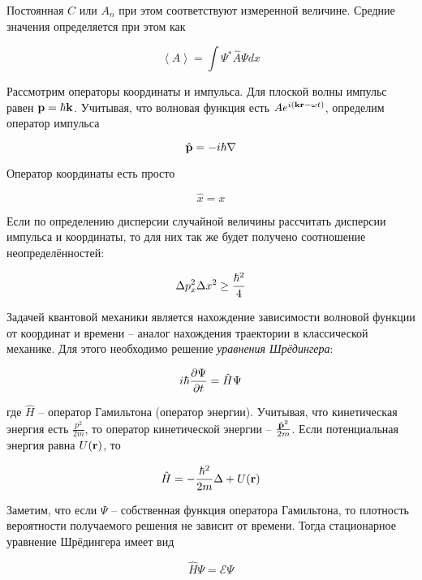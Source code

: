 \noindent
Постоянная $C$ или $A_n$ при этом соответствуют измеренной величине. Средние значения определяется при этом как

\begin{equation}
    \left< A \right> = \int \Psi^* \hat{A} \Psi dx
\end{equation}

Рассмотрим операторы координаты и импульса. Для плоской волны импульс равен $\mathbf p = \hbar \mathbf k$. Учитывая, что волновая функция есть $A e^{i \left( \mathbf k \mathbf r - \omega t \right)}$, определим оператор импульса

\begin{equation}
    \hat{\mathbf p} = - i \hbar \nabla
\end{equation}

\noindent
Оператор координаты есть просто

\begin{equation}
    \hat{x} = x
\end{equation}

Если по определению дисперсии случайной величины рассчитать дисперсии импульса и координаты, то для них так же будет получено соотношение неопределённостей:

\begin{equation}
    \Delta p_x^2 \Delta x^2 \geq \frac{\hbar^2}{4}
\end{equation}

Задачей квантовой механики является нахождение зависимости волновой функции от координат и времени -- аналог нахождения траектории в классической механике. Для этого необходимо решение \textit{уравнения Шрёдингера}:

\begin{equation}
    i \hbar \frac{\partial \Psi}{\partial t} = \hat{H} \Psi
\end{equation}

\noindent
где $\hat H$ -- оператор Гамильтона (оператор энергии). Учитывая, что кинетическая энергия есть $\frac{p^2}{2 m}$, то оператор кинетической энергии -- $\frac{\hat{\mathbf p}^2}{2 m}$. Если потенциальная энергия равна $U (\mathbf r)$, то

\begin{equation}
    \hat{H} = - \frac{\hbar^2}{2 m} \Delta + U(\mathbf r)
\end{equation}

\noindent
Заметим, что если $\Psi$ -- собственная функция оператора Гамильтона, то плотность вероятности получаемого решения не зависит от времени. Тогда стационарное уравнение Шрёдингера имеет вид

\begin{equation}
    \hat{H} \Psi = \mathcal{E} \Psi
\end{equation}